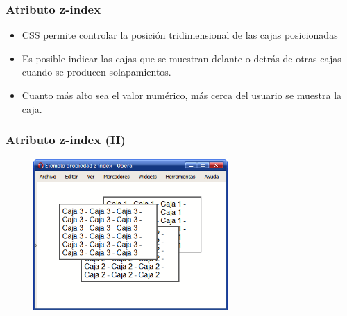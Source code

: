 \documentclass[ucs]{beamer}
\begin{document}

\begin{frame}
\frametitle{Atributo z-index}

\begin{itemize}
  \item CSS permite controlar la posición tridimensional de las cajas posicionadas
  \item Es posible indicar las cajas que se muestran delante o detrás de otras cajas cuando se producen solapamientos.
  \item Cuanto más alto sea el valor numérico, más cerca del usuario se muestra la caja.
\end{itemize}

\end{frame}



\begin{frame}
\frametitle{Atributo z-index (II)}


\begin{center}
\begin{figure}[p]
\includegraphics[width=0.66\textwidth]{figs/f0525.png}
\end{figure}
\end{center}

\end{frame}



\end{document}
